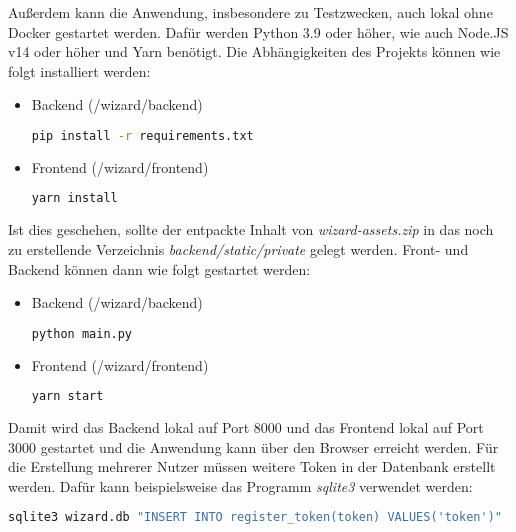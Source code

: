 Außerdem kann die Anwendung, insbesondere zu Testzwecken, auch lokal ohne Docker gestartet werden. Dafür werden Python 3.9 oder höher, wie auch Node.JS v14 oder höher und Yarn benötigt. Die Abhängigkeiten des Projekts können wie folgt installiert werden:

\begin{itemize}
	\item Backend (/wizard/backend)
	\begin{lstlisting}[language=bash]
	pip install -r requirements.txt
	\end{lstlisting}
	\item Frontend (/wizard/frontend)
	\begin{lstlisting}[language=bash]
	yarn install
	\end{lstlisting}
\end{itemize}

Ist dies geschehen, sollte der entpackte Inhalt von \textit{wizard-assets.zip} in das noch zu erstellende Verzeichnis \textit{backend/static/private} gelegt werden. Front- und Backend können dann wie folgt gestartet werden:

\begin{itemize}
	\item Backend (/wizard/backend)
	\begin{lstlisting}[language=bash]
	python main.py
	\end{lstlisting}
	\item Frontend (/wizard/frontend)
	\begin{lstlisting}[language=bash]
	yarn start
	\end{lstlisting}
\end{itemize}

Damit wird das Backend lokal auf Port 8000 und das Frontend lokal auf Port 3000 gestartet und die Anwendung kann über den Browser erreicht werden. Für die Erstellung mehrerer Nutzer müssen weitere Token in der Datenbank erstellt werden. Dafür kann beispielsweise das Programm \textit{sqlite3} verwendet werden:

\begin{lstlisting}[language=bash]
	sqlite3 wizard.db "INSERT INTO register_token(token) VALUES('token')"
\end{lstlisting}